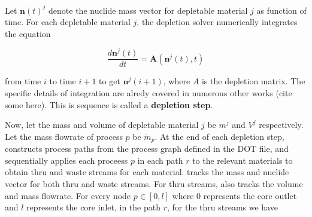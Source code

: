 Let $\mathbf{n}(t)^{j}$ denote the nuclide mass vector for depletable material
$j$ as function of time. For each depletable material $j$, the depletion solver numerically
integrates the equation

\begin{equation}
    \frac{d\mathbf{n}^{j}(t)}{dt} = \mathbf{A}(\mathbf{n}^{j}(t), t)
\end{equation}

from time $i$ to time $i+1$ to get $\mathbf{n}^{j}(i+1)$, where $A$ is the
depletion matrix. The specific details of integration are alredy covered in
numerous other works (cite some here). This is sequence is called a {\bf depletion
step}.

Now, let the mass and volume of depletable material $j$ be
$m^{j}$ and $V^{j}$ respectively. Let the mass flowrate of process $p$ be
$\dot{m}_{p}$. At the end of each depletion step, \SaltProc constructs process
paths from the process graph defined in the DOT file, and sequentially applies
each proceess $p$ in each path $r$ to the relevant materials to obtain thru
and waste streams for each material. \SaltProc tracks the mass and nuclide vector for both thru and waste streams. For thru
streams, \SaltProc also tracks the volume and mass flowrate. For every node
$p\in[0,l]$ where $0$ represents the core outlet and $l$ represents the core
inlet, in the path $r$, for the thru streams we have

